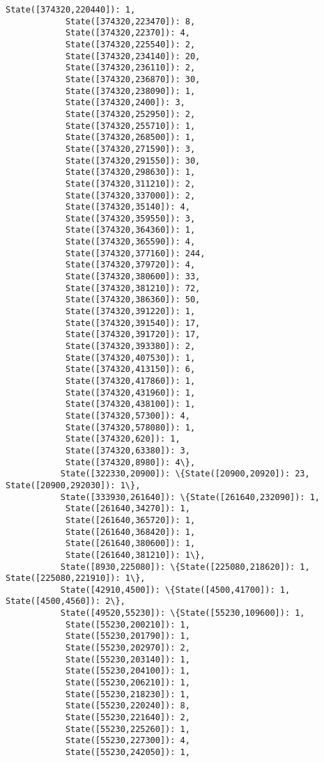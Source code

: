 \documentclass[11pt]{article}
\begin{document}
\begin{Verbatim}[commandchars=\\\{\}]
            State([374320,220440]): 1,
            State([374320,223470]): 8,
            State([374320,22370]): 4,
            State([374320,225540]): 2,
            State([374320,234140]): 20,
            State([374320,236110]): 2,
            State([374320,236870]): 30,
            State([374320,238090]): 1,
            State([374320,2400]): 3,
            State([374320,252950]): 2,
            State([374320,255710]): 1,
            State([374320,268500]): 1,
            State([374320,271590]): 3,
            State([374320,291550]): 30,
            State([374320,298630]): 1,
            State([374320,311210]): 2,
            State([374320,337000]): 2,
            State([374320,35140]): 4,
            State([374320,359550]): 3,
            State([374320,364360]): 1,
            State([374320,365590]): 4,
            State([374320,377160]): 244,
            State([374320,379720]): 4,
            State([374320,380600]): 33,
            State([374320,381210]): 72,
            State([374320,386360]): 50,
            State([374320,391220]): 1,
            State([374320,391540]): 17,
            State([374320,391720]): 17,
            State([374320,393380]): 2,
            State([374320,407530]): 1,
            State([374320,413150]): 6,
            State([374320,417860]): 1,
            State([374320,431960]): 1,
            State([374320,438100]): 1,
            State([374320,57300]): 4,
            State([374320,578080]): 1,
            State([374320,620]): 1,
            State([374320,63380]): 3,
            State([374320,8980]): 4\},
           State([322330,20900]): \{State([20900,20920]): 23, State([20900,292030]): 1\},
           State([333930,261640]): \{State([261640,232090]): 1,
            State([261640,34270]): 1,
            State([261640,365720]): 1,
            State([261640,368420]): 1,
            State([261640,380600]): 1,
            State([261640,381210]): 1\},
           State([8930,225080]): \{State([225080,218620]): 1, State([225080,221910]): 1\},
           State([42910,4500]): \{State([4500,41700]): 1, State([4500,4560]): 2\},
           State([49520,55230]): \{State([55230,109600]): 1,
            State([55230,200210]): 1,
            State([55230,201790]): 1,
            State([55230,202970]): 2,
            State([55230,203140]): 1,
            State([55230,204100]): 1,
            State([55230,206210]): 1,
            State([55230,218230]): 1,
            State([55230,220240]): 8,
            State([55230,221640]): 2,
            State([55230,225260]): 1,
            State([55230,227300]): 4,
            State([55230,242050]): 1,

\end{Verbatim}
\end{document}
